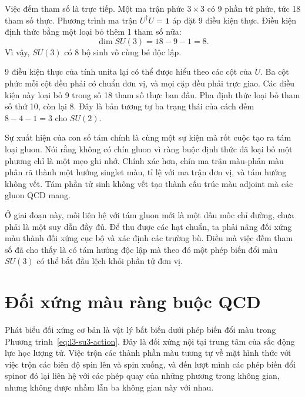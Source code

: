 Việc đếm tham số là trực tiếp. Một ma trận phức \(3\times3\) có 9
phần tử phức, tức 18 tham số thực. Phương trình ma trận
\(U^\dagger U=\boldsymbol 1\) áp đặt 9 điều kiện thực. Điều kiện định thức bằng một
loại bỏ thêm 1 tham số nữa:
\begin{equation}
\dim SU(3)=18-9-1=8.
\end{equation}
Vì vậy, \(SU(3)\) có 8 bộ sinh vô cùng bé độc lập.

9 điều kiện thực của tính unita lại có thể được hiểu theo các cột của
\(U\). Ba cột phức mỗi cột đều phải có chuẩn đơn vị, và mọi cặp
đều phải trực giao. Các điều kiện này loại bỏ 9 trong số 18 tham số thực
ban đầu. Pha định thức loại bỏ tham số thứ 10, còn lại 8.
Đây là bản tương tự ba trạng thái của cách đếm \(8-4-1=3\) cho \(SU(2)\).

Sự xuất hiện của con số tám chính là cùng một sự kiện mà rốt cuộc tạo ra tám loại gluon. Nói rằng không có chín gluon vì ràng buộc định thức đã loại bỏ một phương chỉ là một mẹo ghi nhớ. Chính xác hơn, chín ma trận màu-phản màu phân rã thành một hướng singlet màu, tỉ lệ với ma trận đơn vị, và tám hướng không vết. Tám phần tử sinh không vết tạo thành cấu trúc màu adjoint mà các gluon QCD mang.

Ở giai đoạn này, mối liên hệ với tám gluon mới là một dấu mốc chỉ đường, chưa phải là một suy dẫn đầy đủ. Để thu được các hạt chuẩn, ta phải nâng đối xứng màu thành đối xứng cục bộ và xác định các trường bù. Điều mà việc đếm tham số đã cho thấy là có tám hướng độc lập mà theo đó một phép biến đổi màu \(SU(3)\) có thể bắt đầu lệch khỏi phần tử đơn vị.

\section{Đối xứng màu ràng buộc QCD}

Phát biểu đối xứng cơ bản là vật lý bất biến dưới phép biến đổi màu trong Phương trình~\eqref{eq:l3-su3-action}. Đây là đối xứng nội tại trung tâm của sắc động lực học lượng tử. Việc trộn các thành phần màu tương tự về mặt hình thức với việc trộn các biên độ spin lên và spin xuống, và đến lượt mình các phép biến đổi spinor đó lại liên hệ với các phép quay của những phương trong không gian, nhưng không được nhầm lẫn ba không gian này với nhau.

